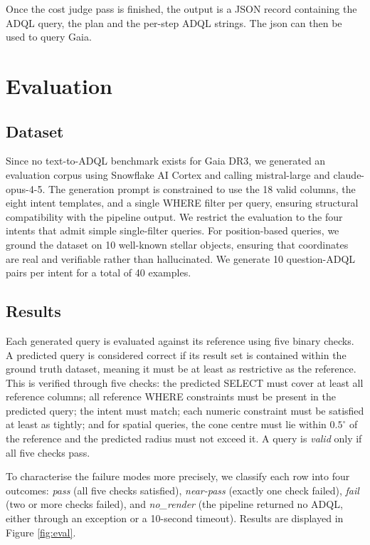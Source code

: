 \documentclass[fleqn,moreauthors,10pt]{ds_report}
\begin{document}
Once the cost judge pass is finished, the output is a JSON record containing the ADQL query, the plan and the per-step ADQL strings. The json can then be used to query Gaia. 

\section{Evaluation}
\label{sec:evaluation}

\subsection{Dataset}
Since no text-to-ADQL benchmark exists for Gaia DR3, we generated an evaluation corpus using Snowflake AI Cortex and calling mistral-large and claude-opus-4-5. The generation prompt is constrained to use the 18 valid columns, the eight intent templates, and a single WHERE filter per query, ensuring structural compatibility with the pipeline output. We restrict the evaluation to the four intents that admit simple single-filter queries. For position-based queries, we ground the dataset on 10 well-known stellar objects, ensuring that coordinates are real and verifiable rather than hallucinated. We generate 10 question-ADQL pairs per intent for a total of 40 examples.

\subsection{Results}

Each generated query is evaluated against its reference using five binary checks. A predicted query is considered correct if its result set is contained within the ground truth dataset, meaning it must be at least as restrictive as the reference. This is verified through five checks: the predicted SELECT must cover at least all reference columns; all reference WHERE constraints must be present in the predicted query; the intent must match; each numeric constraint must be satisfied at least as tightly; and for spatial queries, the cone centre must lie within $0.5^{\circ}$ of the reference and the predicted radius must not exceed it. A query is \emph{valid} only if all five checks pass.

To characterise the failure modes more precisely, we classify each row into
four outcomes: \emph{pass} (all five checks satisfied), \emph{near-pass}
(exactly one check failed), \emph{fail} (two or more checks failed), and
\emph{no\_render} (the pipeline returned no ADQL, either through an
exception or a 10-second timeout). Results are displayed in Figure \ref{fig:eval}.
\end{document}
